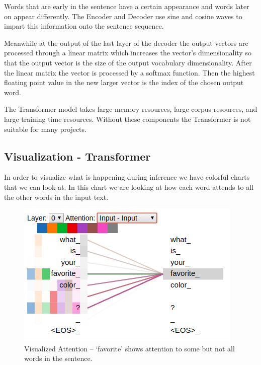 Words that are early in the sentence have a certain appearance and words later on appear differently. The Encoder and Decoder use sine and cosine waves to impart this information onto the sentence sequence. 

Meanwhile at the output of the last layer of the decoder the output vectors are processed through a linear matrix which increases the vector's dimensionality so that the output vector is the size of the output vocabulary dimensionality. After the linear matrix the vector is processed by a softmax function. Then the highest floating point value in the new larger vector is the index of the chosen output word.

The Transformer model takes large memory resources, large corpus resources, and large training time resources. Without these components the Transformer is not suitable for many projects.



\subsection*{Visualization - Transformer}

In order to visualize what is happening during inference we have colorful charts that we can look at. In this chart we are looking at how each word attends to all the other words in the input text.

\begin{figure}[H]
	\begin{center}
		\includegraphics[scale=2]{Figure_3}
		
		
	\end{center}
	\caption[Visualized Attention]{Visualized Attention -- `favorite' shows attention to some but not all words in the sentence.}
	
	
\end{figure}


